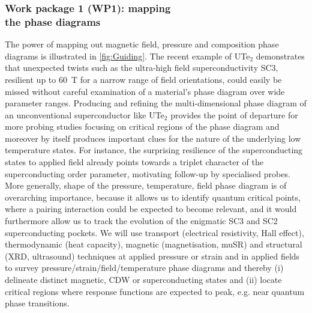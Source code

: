 \subsubsection*{Work package 1 (WP1): mapping \\
the phase diagrams} 
\noindent The power of mapping out magnetic field, pressure and composition phase diagrams is illustrated in \autoref{fig:Guiding}. The recent example of UTe$_2$ demonstrates that unexpected twists such as the ultra-high field superconductivity SC3, resilient up to \SI{60}{\tesla} for a narrow range of field orientations, could easily be missed without careful examination of a material's phase diagram over wide parameter ranges. Producing and refining the multi-dimensional phase diagram of an unconventional superconductor like UTe$_2$ provides the point of departure for more probing studies focusing on critical regions of the phase diagram and moreover by itself produces important clues for the nature of the underlying low temperature states. For instance, the surprising resilience of the superconducting states to applied field already points towards a triplet character of the superconducting order parameter, motivating follow-up by specialised probes. More generally, shape of the pressure, temperature, field phase diagram is of overarching importance, because it allows us to identify quantum critical points, where a pairing interaction could be expected to become relevant, and it would furthermore allow us to track the evolution of the enigmatic SC3 and SC2 superconducting pockets.
We will use transport (electrical resistivity, Hall effect), thermodynamic (heat capacity), magnetic (magnetisation, muSR) and structural (XRD, ultrasound) techniques at applied pressure or strain and in applied fields to survey pressure/strain/field/temperature phase diagrams and thereby  (i) delineate distinct magnetic, CDW or superconducting states and (ii) locate critical regions where response functions are expected to peak, e.g. near quantum phase transitions.





